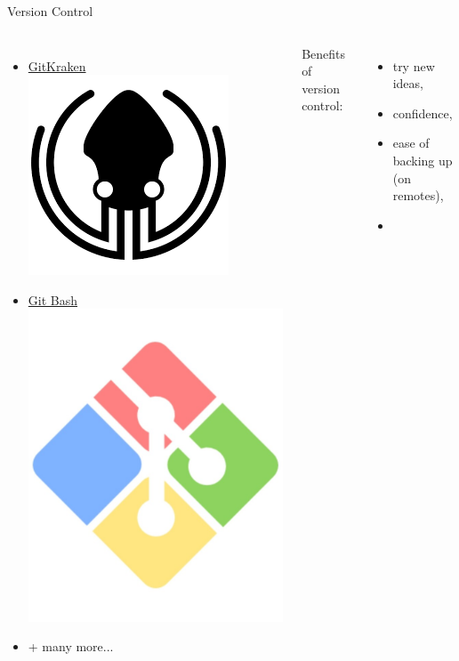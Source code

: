 \documentclass{beamer} %
\begin{document}
\begin{frame}{Version Control}
\begin{columns}
\begin{itemize}
          \item \href{https://www.gitkraken.com/}{GitKraken \includegraphics[height=.05\textheight]{gitkraken}}
          \item \href{https://gitforwindows.org/}{Git Bash \includegraphics[height=.07\textheight]{gitbash}}
          \item + many more...
        \end{itemize}


      Benefits of version control:
      \begin{itemize}
        \item try new ideas,
        \item confidence,
        \item ease of backing up (on remotes),
        \item 
      \end{itemize}
    \end{columns}
    

\end{frame}
\end{document}

